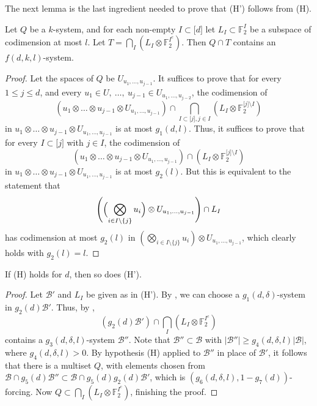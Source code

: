 \documentclass{toc}
\newcommand\F{\mathbb{F}}
\renewcommand\d{\delta}
\newcommand \cB{\mathcal B}
\newcommand \s{\subset}
\begin{document}
The next lemma is the last ingredient needed to prove that (H') follows from (H).

\begin{lemma} \label{systemspace}
	Let $Q$ be a $k$-system, and for each non-empty $I\s \lbrack d\rbrack$ let $L_I\s \F_2^{I}$ be a subspace of codimension at most $l$. Let $T=\bigcap_I(L_I\otimes \F_2^{I^c})$. Then $Q\cap T$ contains an $f(d,k,l)$-system.
\end{lemma}

\begin{proof}
  Let the spaces of $Q$ be $U_{u_1,\dots,u_{j-1}}$. It suffices to prove that for every $1\leq j\leq d$, and every $u_1\in U,\ \dots,\ u_{j-1}\in U_{u_1,\dots,u_{j-2}}$, the codimension of
  \[
    (u_1\otimes \dots\otimes u_{j-1}\otimes U_{u_1,\dots,u_{j-1}})\cap \bigcap_{I\subset \lbrack j\rbrack, j\in I}(L_I\otimes \F_2^{\lbrack j\rbrack \setminus I})
  \]
  in $u_1\otimes \dots\otimes u_{j-1}\otimes U_{u_1,\dots,u_{j-1}}$ is
  at most $g_1(d,l)$. Thus, it suffices to prove that for every
  $I\s \lbrack j\rbrack$ with $j\in I$, the codimension of
  \[
    (u_1\otimes \dots\otimes u_{j-1}\otimes
  U_{u_1,\dots,u_{j-1}})\cap(L_I\otimes \F_2^{\lbrack j\rbrack
    \setminus I})
\]
in $u_1\otimes \dots\otimes u_{j-1}\otimes U_{u_1,\dots,u_{j-1}}$ is
at most $g_2(l)$. But this is equivalent to the statement that
\[
  \Biggl(\Bigl(\bigotimes_{i\in I\setminus \{j\}}u_i\Bigr)\otimes
  U_{u_1,\dots,u_{j-1}}\Biggr)\cap L_I
\]
has codimension at most $g_2(l)$ in
$(\bigotimes_{i\in I\setminus \{j\}}u_i)\otimes
U_{u_1,\dots,u_{j-1}}$, which clearly holds with $g_2(l)=l$.
\end{proof}

\begin{lemma} \label{htoh'}
	If (H) holds for $d$, then so does (H').
\end{lemma}

\begin{proof}
  Let $\cB'$ and $L_I$ be given as in (H'). By , we can choose a $g_1(d,\d)$-system in $g_2(d)\cB'$. Thus, by ,
  \[
    (g_2(d)\cB')\cap\bigcap_I(L_I\otimes \F_2^{I^c})
  \]
  contains a $g_3(d,\d,l)$-system $\cB''$. Note that $\cB''\s \cB$
  with $|\cB''|\geq g_4(d,\d,l)|\cB|$, where $g_4(d,\d,l)>0$. By
  hypothesis (H) applied to $\cB''$ in place of $\cB'$, it follows
  that there is a multiset $Q$, with elements chosen from
  $\cB\cap g_5(d)\cB''\s \cB\cap g_5(d)g_2(d)\cB'$, which is
  $(g_6(d,\d,l),1-g_7(d))$-forcing. Now
  $Q\subset \bigcap_I(L_I\otimes \F_2^{I^c})$, finishing the proof.
\end{proof}
\end{document}
